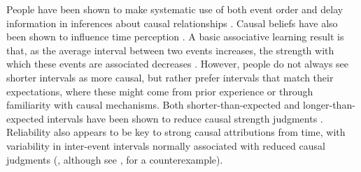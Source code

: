 \documentclass{cambridge7A}%
\begin{document}
People have been shown to make systematic use of both event order \citep{bramley2014order} and delay information in inferences about causal relationships \citep{buehner2003rethinking,buehner2004abolishing,buehner2006temporal}. Causal beliefs have also been shown to influence time perception \citep{bechlivanidis2013does,buehner2009causal,haggard2002voluntary}.  A basic associative learning result is that, as the average interval between two events increases, the strength with which these events are associated decreases \citep{wolfe1921effect,shanks1987associative, grice1948relation}.  However, people do not always see shorter intervals as more causal, but rather prefer intervals that match their expectations, where these might come from prior experience or through familiarity with causal mechanisms.  
Both shorter-than-expected and longer-than-expected intervals have been shown to reduce causal strength judgments \citep{buehner2004abolishing, schlottmann1999seeing,buehner2002knowledge,greville2010temporal,hagmayer2002temporal,buehner2003rethinking,greville2016temporal}.  Reliability also appears to be key to strong causal attributions from time, with variability in inter-event intervals normally associated with reduced causal judgments (\citealp{greville2010temporal,lagnado2010influence,greville2013structural}, although see \citealp{young2009problem}, for a counterexample).
\end{document}
